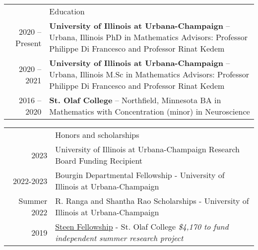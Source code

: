 \documentclass[letterpaper, 11pt]{article}
\newcommand{\headingfont}{\Large\color{Red}}
\newenvironment{SectionTable}[1]{
	\renewcommand*{\arraystretch}{1.7}
	\setlength{\tabcolsep}{10pt}
	\begin{longtable}{Rp{5.2in}} & #1 \\}
	{\end{longtable}\vspace{-.3cm}}
\newenvironment{SectionTableSingleSpace}[1]{
	\renewcommand*{\arraystretch}{1.2}
	\setlength{\tabcolsep}{10pt}
	\begin{longtable}{Rp{5.2in}} & #1 \\[0.6em]}
	{\end{longtable}\vspace{-.3cm}}
\begin{document}
	\begin{SectionTable}{\headingfont Education}
		2020 -- Present & 
		\textbf{University of Illinois at Urbana-Champaign} -- Urbana, Illinois \newline
		PhD in Mathematics \newline 
		Advisors: Professor Philippe Di Francesco and Professor Rinat Kedem %
		\\
		2020 -- 2021 & 
		\textbf{University of Illinois at Urbana-Champaign} -- Urbana, Illinois \newline
		M.Sc in Mathematics \newline 
		Advisors: Professor Philippe Di Francesco and Professor Rinat Kedem %
		\\
		2016 -- 2020 & 
		\textbf{St. Olaf College} -- Northfield, Minnesota \newline
		BA in Mathematics with Concentration (minor) in Neuroscience \newline 
		\\
		
		
		
		
	\end{SectionTable}
	
	
	\begin{SectionTableSingleSpace}{\headingfont Honors and scholarships}
		2023 &
		University of Illinois at Urbana-Champaign Research Board Funding Recipient\newline
		\\

		2022-2023 &
		Bourgin Departmental Fellowship - University of Illinois at Urbana-Champaign\newline
		\\
		
		Summer 2022 &
		R. Ranga and Shantha Rao Scholarships - University of Illinois at Urbana-Champaign  \newline
		\\
		

		2019 &
		\href{https://wp.stolaf.edu/curi/summer-undergraduate-research}{Steen Fellowship} - St. Olaf College \newline 
		\textit{\$4,170  to fund independent summer research project}
		\\
		
		
	\end{SectionTableSingleSpace}
	
\end{document}
